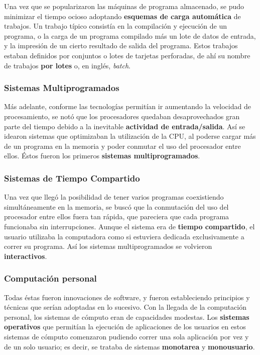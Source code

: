 \documentclass[spanish,a4paper,]{article}
\begin{document}
Una vez que se popularizaron las máquinas de programa almacenado, se
pudo minimizar el tiempo ocioso adoptando \textbf{esquemas de carga
automática} de trabajos. Un trabajo típico consistía en la compilación y
ejecución de un programa, o la carga de un programa compilado más un
lote de datos de entrada, y la impresión de un cierto resultado de
salida del programa. Estos trabajos estaban definidos por conjuntos o
lotes de tarjetas perforadas, de ahí su nombre de trabajos \textbf{por
lotes} o, en inglés, \emph{batch}.

\hypertarget{sistemas-multiprogramados}{%
\subsubsection{Sistemas
Multiprogramados}\label{sistemas-multiprogramados}}

Más adelante, conforme las tecnologías permitían ir aumentando la
velocidad de procesamiento, se notó que los procesadores quedaban
desaprovechados gran parte del tiempo debido a la inevitable
\textbf{actividad de entrada/salida}. Así se idearon sistemas que
optimizaban la utilización de la CPU, al poderse cargar más de un
programa en la memoria y poder conmutar el uso del procesador entre
ellos. Éstos fueron los primeros \textbf{sistemas multiprogramados}.

\hypertarget{sistemas-de-tiempo-compartido}{%
\subsubsection{Sistemas de Tiempo
Compartido}\label{sistemas-de-tiempo-compartido}}

Una vez que llegó la posibilidad de tener varios programas coexistiendo
simultáneamente en la memoria, se buscó que la conmutación del uso del
procesador entre ellos fuera tan rápida, que pareciera que cada programa
funcionaba sin interrupciones. Aunque el sistema era de \textbf{tiempo
compartido}, el usuario utilizaba la computadora como si estuviera
dedicada exclusivamente a correr su programa. Así los sistemas
multiprogramados se volvieron \textbf{interactivos}.

\hypertarget{computaciuxf3n-personal}{%
\subsubsection{Computación personal}\label{computaciuxf3n-personal}}

Todas éstas fueron innovaciones de software, y fueron estableciendo
principios y técnicas que serían adoptadas en lo sucesivo. Con la
llegada de la computación personal, los sistemas de cómputo eran de
capacidades modestas. Los \textbf{sistemas operativos} que permitían la
ejecución de aplicaciones de los usuarios en estos sistemas de cómputo
comenzaron pudiendo correr una sola aplicación por vez y de un solo
usuario; es decir, se trataba de sistemas \textbf{monotarea} y
\textbf{monousuario}.
\end{document}
